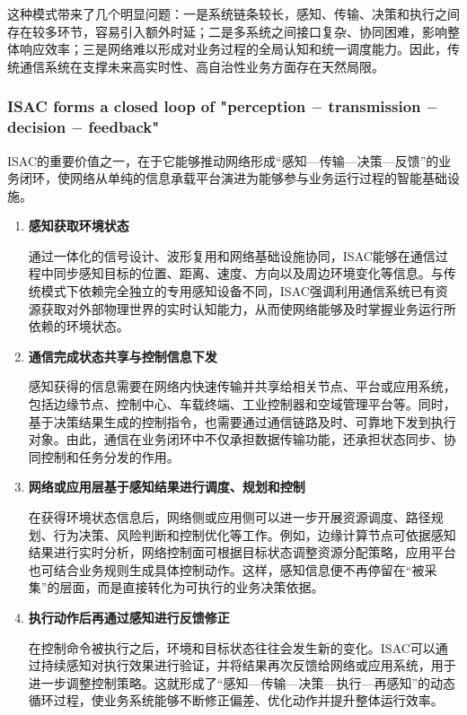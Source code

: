 这种模式带来了几个明显问题：一是系统链条较长，感知、传输、决策和执行之间存在较多环节，容易引入额外时延；二是多系统之间接口复杂、协同困难，影响整体响应效率；三是网络难以形成对业务过程的全局认知和统一调度能力。因此，传统通信系统在支撑未来高实时性、高自治性业务方面存在天然局限。

\subsubsection{ISAC forms a closed loop of "perception $-$ transmission $-$ decision $-$ feedback"}
\label{subsubsec:ch1-isac-core value-closed loop-isac}

ISAC的重要价值之一，在于它能够推动网络形成“感知—传输—决策—反馈”的业务闭环，使网络从单纯的信息承载平台演进为能够参与业务运行过程的智能基础设施。

\begin{enumerate}[label=(\arabic*)]
\item\textbf{感知获取环境状态}

通过一体化的信号设计、波形复用和网络基础设施协同，ISAC能够在通信过程中同步感知目标的位置、距离、速度、方向以及周边环境变化等信息。与传统模式下依赖完全独立的专用感知设备不同，ISAC强调利用通信系统已有资源获取对外部物理世界的实时认知能力，从而使网络能够及时掌握业务运行所依赖的环境状态。

\item\textbf{通信完成状态共享与控制信息下发}

感知获得的信息需要在网络内快速传输并共享给相关节点、平台或应用系统，包括边缘节点、控制中心、车载终端、工业控制器和空域管理平台等。同时，基于决策结果生成的控制指令，也需要通过通信链路及时、可靠地下发到执行对象。由此，通信在业务闭环中不仅承担数据传输功能，还承担状态同步、协同控制和任务分发的作用。

\item\textbf{网络或应用层基于感知结果进行调度、规划和控制}

在获得环境状态信息后，网络侧或应用侧可以进一步开展资源调度、路径规划、行为决策、风险判断和控制优化等工作。例如，边缘计算节点可依据感知结果进行实时分析，网络控制面可根据目标状态调整资源分配策略，应用平台也可结合业务规则生成具体控制动作。这样，感知信息便不再停留在“被采集”的层面，而是直接转化为可执行的业务决策依据。

\item\textbf{执行动作后再通过感知进行反馈修正}

在控制命令被执行之后，环境和目标状态往往会发生新的变化。ISAC可以通过持续感知对执行效果进行验证，并将结果再次反馈给网络或应用系统，用于进一步调整控制策略。这就形成了“感知—传输—决策—执行—再感知”的动态循环过程，使业务系统能够不断修正偏差、优化动作并提升整体运行效率。
\end{enumerate}

